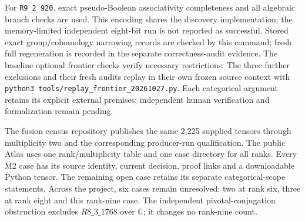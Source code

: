 \documentclass[11pt,a4paper]{article}
\theoremstyle{remark}\newtheorem{remark}[theorem]{Remark}
\newcommand{\C}{\mathbb C}\newcommand{\Q}{\mathbb Q}\newcommand{\Z}{\mathbb Z}
\begin{document}
For \texttt{R9\_2\_920}, exact pseudo-Boolean associativity completeness and
all algebraic branch checks are used. This encoding shares the discovery
implementation; the memory-limited independent eight-bit run is not
reported as successful. Stored exact group/cohomology narrowing records
are checked by this command; fresh full regeneration is recorded in the
separate correctness-audit evidence. The baseline optional frontier checks verify necessary restrictions. The three further exclusions and their fresh audits replay in their own frozen source context with \texttt{python3 tools/replay\_frontier\_20261027.py}.
Each categorical argument retains its explicit external premises;
independent human verification and formalization remain pending.

The fusion census repository publishes the same 2,225 supplied tensors
through multiplicity two and the corresponding producer-run qualification.
The public Atlas uses one rank/multiplicity table and one case directory
for all ranks. Every M2 case has its source identity, current decision,
proof links and a downloadable Python tensor. The remaining open case retains its separate categorical-scope statements.
Across the project, six cases remain unresolved: two at rank six, three at
rank eight and this rank-nine case. The independent pivotal-conjugation
obstruction excludes $R8\_3\_1768$ over $\C$; it changes no rank-nine count.
\end{document}
